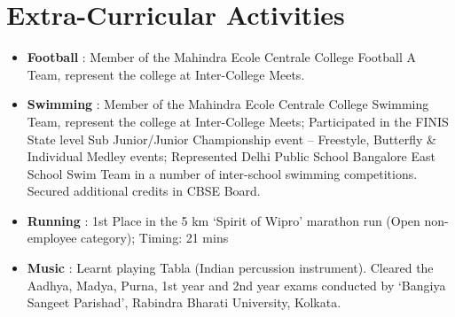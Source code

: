 \documentclass[letterpaper,11pt]{article}
\begin{document}
\section{Extra-Curricular Activities}
	\begin{itemize}
		\item \textbf{Football} : Member of the Mahindra Ecole Centrale College Football A Team, represent the college at Inter-College Meets.
		\item \textbf{Swimming} : Member of the Mahindra Ecole Centrale College Swimming Team, represent the college at Inter-College Meets; Participated in the FINIS State level Sub Junior/Junior Championship event – Freestyle, Butterfly \& Individual Medley events; Represented Delhi Public School Bangalore East School Swim Team in a number of inter-school swimming competitions. Secured additional credits in CBSE Board.
		\item \textbf{Running} : 1st Place in the 5 km ‘Spirit of Wipro’ marathon run (Open non-employee category); Timing: 21 mins
		\item \textbf{Music} : Learnt playing Tabla (Indian percussion instrument). Cleared the Aadhya, Madya, Purna, 1st  year and 2nd year exams conducted by ‘Bangiya Sangeet Parishad’, Rabindra Bharati University, Kolkata.
	\end{itemize}
\end{document}
